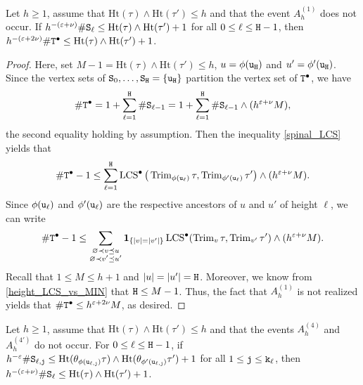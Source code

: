 \documentclass[11pt,reqno]{amsart}
\newcommand{\Ht}{\mathrm{Ht}}
\newcommand{\Trim}{\operatorname{Trim}}
\newcommand{\LCS}{\operatorname{LCS}}
\newcommand{\eps}{\varepsilon}
\begin{document}
\begin{lem}
\label{lem:B_cases}
Let $h\geq 1$, assume that $\Ht(\tau)\wedge\Ht(\tau')\leq h$ and that the event $A_h^{(1)}$ does not occur. If $h^{-(\varepsilon+\nu)}\# \ttS_\ell\leq \Ht(\tau)\wedge\Ht(\tau')+1$ for all $0\leq \ell\leq \mathtt{H}-1$, then $h^{-(\eps+2\nu)}\#\ttT^\bullet\leq  \Ht(\tau)\wedge\Ht(\tau')+1$.
\end{lem}

\begin{proof}
Here, set $M-1=\Ht(\tau)\wedge\Ht(\tau')\leq h$, $u=\phi(\mathtt{u}_{\mathtt{H}})$ and $u'=\phi'(\mathtt{u}_{\mathtt{H}})$. Since the vertex sets of $\mathtt{S}_0,\ldots,\mathtt{S}_{\mathtt{H}}=\{\mathtt{u}_{\mathtt{H}}\}$ partition the vertex set of $\mathtt{T}^\bullet$, we have 
\[\#\mathtt{T}^\bullet=1+\sum_{\ell=1}^{\mathtt{H}}\#\mathtt{S}_{\ell-1}=1+\sum_{\ell=1}^{\mathtt{H}}\#\mathtt{S}_{\ell-1}\wedge (h^{\varepsilon+\nu} M),\]
the second equality holding by assumption.
Then the inequality \eqref{spinal_LCS} yields that
\[\#\ttT^\bullet-1\leq \sum_{\ell=1}^{\ttH}\LCS^\bullet\big(\Trim_{\phi(\ttu_\ell)}\tau,\Trim_{\phi'(\ttu_\ell)}\tau'\big)\wedge (h^{\varepsilon+\nu} M).\]
Since $\phi(\mathtt{u}_\ell)$ and $\phi'(\mathtt{u}_\ell)$ are the respective ancestors of $u$ and $u'$ of height $\ell$, we can write 
\[\#\ttT^\bullet -1\leq \sum_{\substack{\varnothing\prec v\preceq u\\ \varnothing\prec v'\preceq u'}}\I{|v|=|v'|}\LCS^\bullet(\Trim_v\tau,\Trim_{v'}\tau')\wedge (h^{\varepsilon+\nu} M).\]
Recall that $1\leq M\leq h+1$ and $|u|=|u'|=\mathtt{H}$. Moreover, we know from \eqref{height_LCS_vs_MIN} that $\mathtt{H}\leq M-1$. Thus, the fact that $A_h^{(1)}$ is not realized yields that $\#\ttT^\bullet\leq h^{\eps+2\nu} M$, as desired.
\end{proof}

\begin{lem}
\label{lem:A_cases}
Let $h\geq 1$, assume that $\Ht(\tau)\wedge\Ht(\tau')\leq h$ and that the events $A_h^{(4)}$ and $A_h^{(4')}$ do not occur. For $0\leq \ell\leq \mathtt{H}-1$, if $h^{-\varepsilon}\# \ttS_{\ell,\ttj} \leq \Ht(\theta_{\phi(\ttu_{\ell,\ttj})}\tau)\wedge \Ht(\theta_{\phi'(\ttu_{\ell,\ttj})}\tau')+1$ for all $1\leq \mathtt{j}\leq \mathtt{k}_\ell$, then $h^{-(\eps+\nu)}\# \ttS_\ell\leq  \Ht(\tau)\wedge\Ht(\tau')+1$.
\end{lem}
\end{document}
